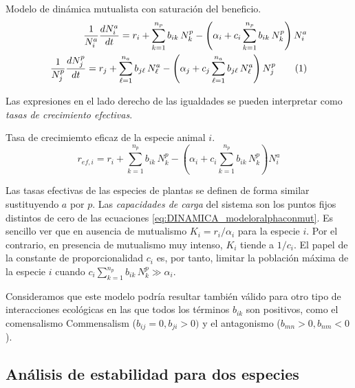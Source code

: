 \begin{theo} 
Modelo de dinámica mutualista con saturación del beneficio.
\begin{align*}
\frac{1}{N^{a}_{i}}\frac{dN^{a}_{i}}{dt} = r_{i}+ \sum_{k=1}^{n_{p}} b_{ik}\, N^{p}_k - \left( \alpha_{i}+ c_{i} \sum_{k=1}^{n_{p}} b_{ik}\, N^{p}_k \right) N^{a}_{i} \nonumber\\
\frac{1}{N^{p}_{j}}\frac{dN^{p}_{j}}{dt} = r_{j}+ \sum_{\ell=1}^{n_{a}} b_{j\ell}\, N^{a}_\ell - \left( \alpha_{j}+ c_{j} \sum_{\ell=1}^{n_{a}} b_{j\ell}\, N^{a}_\ell \right) N^{p}_{j}
\stepcounter{equation}\tag{\theequation}\label{eq:DINAMICA_modeloralphaconmut}
\end{align*}
\end{theo}


Las expresiones en el lado derecho de las igualdades se pueden interpretar como \textit{tasas de crecimiento efectivas}. 

\begin{theo} 
Tasa de crecimiemto eficaz de la especie animal $i$.
\begin{equation}
r_{ef,i} = r_{i} + \sum_{k=1}^{n_{p}} b_{ik}\, N^{p}_k - \left( \alpha_{i}+ c_{i} \sum_{k=1}^{n_{p}} b_{ik}\, N^{p}_k \right) N^{a}_{i}
\label{eq:DINAMICA_effrate}
\end{equation}
\end{theo}

Las tasas efectivas de las especies de plantas se definen de forma similar sustituyendo $a$ por $p$. Las \textit{capacidades de carga} del sistema son los puntos fijos distintos de cero de las ecuaciones \ref{eq:DINAMICA_modeloralphaconmut}. Es sencillo ver que en ausencia de mutualismo $K_i = r_i/\alpha_i$ para la especie $i$. Por el contrario, en presencia de mutualismo muy intenso, $K_i$ tiende a $1/c_{i}$. El papel de la constante de proporcionalidad $c_i$ es, por tanto, limitar la población máxima de la especie $i$ cuando $c_{i} \sum_{k=1}^{n_p} b_{ik} \, N^p_{k} \gg \alpha_{i}$. 

Consideramos que este modelo podría resultar también válido para otro tipo de interacciones ecológicas en las que todos los términos $b_{ik}$ son positivos, como el comensalismo Commensalism ($b_{ij}=0, b_{ji}>0)$ y el antagonismo ($b_{mn}>0,b_{nm}<0$). 

\subsection{Análisis de estabilidad para dos especies}

